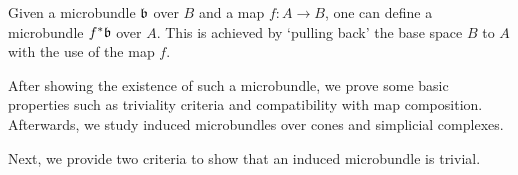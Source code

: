 \begin{myparagraph} Given a microbundle $\bb$ over $B$ and a map $f: A \to B$, one can define a microbundle $\ind{f}\bb$ over $A$. This is achieved by `pulling back' the base space $B$ to $A$ with the use of the map $f$.

After showing the existence of such a microbundle, we prove some basic properties such as triviality criteria and compatibility with map composition. Afterwards, we study induced microbundles over cones and simplicial complexes. \end{myparagraph}   \begin{myparagraph} Next, we provide two criteria to show that an induced microbundle is trivial. \end{myparagraph}     